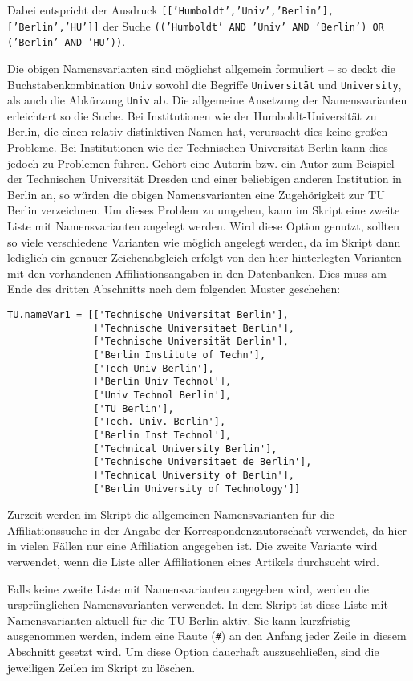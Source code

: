 Dabei entspricht der Ausdruck \texttt{[['Humboldt','Univ','Berlin'], ['Berlin','HU']]} der Suche \texttt{(('Humboldt' AND 'Univ' AND 'Berlin') OR ('Berlin' AND 'HU'))}.

Die obigen Namensvarianten sind möglichst allgemein formuliert -- so deckt die Buchstabenkombination \texttt{Univ} sowohl die Begriffe \texttt{Universität} und \texttt{University}, als auch die Abkürzung \texttt{Univ} ab. Die allgemeine Ansetzung der Namensvarianten erleichtert so die Suche. Bei Institutionen wie der Humboldt-Universität zu Berlin, die einen relativ distinktiven Namen hat, verursacht dies keine großen Probleme. Bei Institutionen wie der Technischen Universität Berlin kann dies jedoch zu Problemen führen. Gehört eine Autorin bzw. ein Autor zum Beispiel der Technischen Universität Dresden und einer beliebigen anderen Institution in Berlin an, so würden die obigen Namensvarianten eine Zugehörigkeit zur TU Berlin verzeichnen. Um dieses Problem zu umgehen, kann im Skript eine zweite Liste mit Namensvarianten angelegt werden. Wird diese Option genutzt, sollten so viele verschiedene Varianten wie möglich angelegt werden, da im Skript dann lediglich ein genauer Zeichenabgleich erfolgt von den hier hinterlegten Varianten mit den vorhandenen Affiliationsangaben in den Datenbanken. Dies muss am Ende des dritten Abschnitts nach dem folgenden Muster geschehen:
\begin{verbatim}
TU.nameVar1 = [['Technische Universitat Berlin'],
               ['Technische Universitaet Berlin'],
               ['Technische Universität Berlin'],
               ['Berlin Institute of Techn'],
               ['Tech Univ Berlin'],
               ['Berlin Univ Technol'],
               ['Univ Technol Berlin'],
               ['TU Berlin'],
               ['Tech. Univ. Berlin'],
               ['Berlin Inst Technol'],
               ['Technical University Berlin'],
               ['Technische Universitaet de Berlin'],
               ['Technical University of Berlin'],
               ['Berlin University of Technology']]
\end{verbatim}

Zurzeit werden im Skript die allgemeinen Namensvarianten für die Affiliationssuche in der Angabe der Korrespondenzautorschaft verwendet, da hier in vielen Fällen nur eine Affiliation angegeben ist. Die zweite Variante wird verwendet, wenn die Liste aller Affiliationen eines Artikels durchsucht wird.

Falls keine zweite Liste mit Namensvarianten angegeben wird, werden die ursprünglichen Namensvarianten verwendet. In dem Skript ist diese Liste mit Namensvarianten aktuell für die TU Berlin aktiv. Sie kann kurzfristig ausgenommen werden, indem eine Raute (\texttt{\#}) an den Anfang jeder Zeile in diesem Abschnitt gesetzt wird. Um diese Option dauerhaft auszuschließen, sind die jeweiligen Zeilen im Skript zu löschen.

